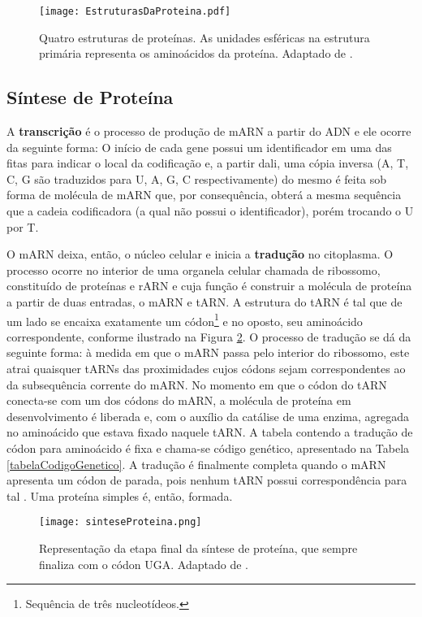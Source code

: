 \begin{figure}[h]
    \centering
    \texttt{[image: EstruturasDaProteina.pdf]}
    \caption{Quatro estruturas de proteínas. As unidades esféricas na estrutura primária representa os aminoácidos da proteína. Adaptado de \cite{drug09}.}
    \label{fig:EstruturasDaProteina}
\end{figure}

\subsection{Síntese de Proteína} \label{sinteseDeProteina}
\indent A \textbf{transcrição} é o processo de produção de mARN a partir do ADN e ele ocorre da seguinte forma: O início de cada gene possui um identificador em uma das fitas para indicar o local da codificação e, a partir dali, uma cópia inversa (A, T, C, G são traduzidos para U, A, G, C respectivamente) do mesmo é feita sob forma de molécula de mARN que, por consequência, obterá a mesma sequência que a cadeia codificadora (a qual não possui o identificador), porém trocando o U por T.

\indent O mARN deixa, então, o núcleo celular e inicia a \textbf{tradução} no citoplasma. O processo ocorre no interior de uma organela celular chamada de ribossomo, constituído de proteínas e rARN e cuja função é construir a molécula de proteína a partir de duas entradas, o mARN e tARN. A estrutura do tARN é tal que de um lado se encaixa exatamente um códon\footnote{Sequência de três nucleotídeos.} e no oposto, seu aminoácido correspondente, conforme ilustrado na Figura \ref{fig:sinteseProteina}. O processo de tradução se dá da seguinte forma: à medida em que o mARN passa pelo interior do ribossomo, este atrai quaisquer tARNs das proximidades cujos códons sejam correspondentes ao da subsequência corrente do mARN. No momento em que o códon do tARN conecta-se com um dos códons do mARN, a molécula de proteína em desenvolvimento é liberada e, com o auxílio da catálise de uma enzima, agregada no aminoácido que estava fixado naquele tARN. A tabela contendo a tradução de códon para aminoácido é fixa e chama-se código genético, apresentado na Tabela \ref{tabelaCodigoGenetico}. A tradução é finalmente completa quando o mARN apresenta um códon de parada, pois nenhum tARN possui correspondência para tal \cite{setubal97}. Uma proteína simples é, então, formada. 

\begin{figure}[h]
    \centering
    \texttt{[image: sinteseProteina.png]}
    \caption{Representação da etapa final da síntese de proteína, que sempre finaliza com o códon UGA. Adaptado de \cite{proteinSyntesis}.}
    \label{fig:sinteseProteina}
\end{figure} 


